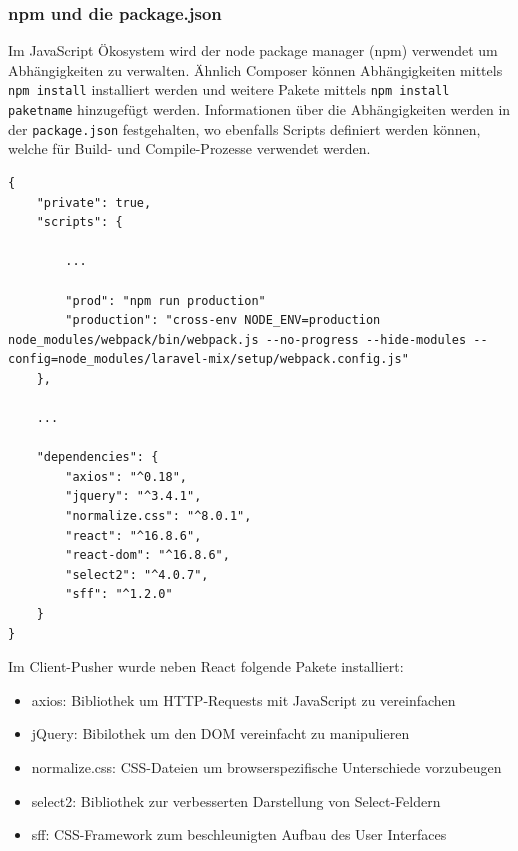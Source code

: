         \subsubsection{npm und die package.json}
            Im JavaScript Ökosystem wird der node package manager (npm) verwendet um Abhängigkeiten zu verwalten. Ähnlich Composer können Abhängigkeiten mittels \texttt{npm install} installiert werden und weitere Pakete mittels \texttt{npm install paketname} hinzugefügt werden. Informationen über die Abhängigkeiten werden in der \texttt{package.json} festgehalten, wo ebenfalls Scripts definiert werden können, welche für Build- und Compile-Prozesse verwendet werden.
            
            \begin{lstlisting}[caption=Ausschnitt package.json des Client-Pushers]
{
    "private": true,
    "scripts": {
    
        ...
        
        "prod": "npm run production"
        "production": "cross-env NODE_ENV=production node_modules/webpack/bin/webpack.js --no-progress --hide-modules --config=node_modules/laravel-mix/setup/webpack.config.js"
    },
   
    ...
    
    "dependencies": {
        "axios": "^0.18",
        "jquery": "^3.4.1",
        "normalize.css": "^8.0.1",
        "react": "^16.8.6",
        "react-dom": "^16.8.6",
        "select2": "^4.0.7",
        "sff": "^1.2.0"
    }
}
        \end{lstlisting}
        
        Im Client-Pusher wurde neben React folgende Pakete installiert:
        
        \begin{itemize}
            \item axios: Bibliothek um HTTP-Requests mit JavaScript zu vereinfachen
            \item jQuery: Bibilothek um den DOM vereinfacht zu manipulieren
            \item normalize.css: CSS-Dateien um browserspezifische Unterschiede vorzubeugen
            \item select2: Bibliothek zur verbesserten Darstellung von Select-Feldern
            \item sff: CSS-Framework zum beschleunigten Aufbau des User Interfaces
        \end{itemize}